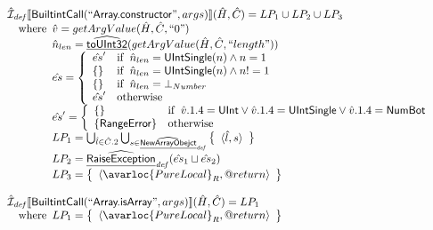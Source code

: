 \[\begin{array}{l}
\aI_{\it def}\lbr \SF{BuiltintCall}(``\SF{Array.constructor}",args)\rbr(\hat{H},\hat{C}) = LP_1 \cup LP_2 \cup LP_3\\
\quad\wherec{
  \hat{v} = getArgValue(\hat{H},\hat{C}, ``0")\\
  \hat{n}_{len} = \ahf{toUInt32}(getArgValue(\hat{H},\hat{C}, ``length"))\\
  \hat{es} = \left\{\begin{array}{ll}
      \hat{es}' & \ifc{\hat{n}_{len} = \SF{UIntSingle}(n) \land n = 1}\\
      \set{} & \ifc{\hat{n}_{len} = \SF{UIntSingle}(n) \land n != 1}\\
      \set{} & \ifc{\hat{n}_{len} = \bot_{Number}}\\
      \hat{es}' & \owc
    \end{array}\right.\\  
  \hat{es}' = \left\{\begin{array}{ll}
      \set{}
      & \ifc{\hat{v}.1.4 = \SF{UInt} \lor \hat{v}.1.4 = \SF{UIntSingle} \lor \hat{v}.1.4 = \SF{NumBot} }\\
      \{ \SF{RangeError} \} & \owc
    \end{array}\right.\\
  LP_1 = \bigcup_{\hat{l} \in \hat{C}.2}\bigcup_{s \in \ahf{NewArrayObejct}_{\it def}}
    \set{\langle \hat{l}, s\rangle}\\
  LP_2 = \ahf{RaiseException}_{\it def}(\hat{es}_1 \sqcup \hat{es}_2)\\
  LP_3 = \set{\langle\avarloc{PureLocal}_R,\varprop{return}\rangle}\\
  }\\
\\



\aI_{\it def}\lbr \SF{BuiltintCall}(``\SF{Array.isArray}",args)\rbr(\hat{H},\hat{C}) = LP_1\\
\quad\wherec{
  LP_1 = \set{\langle\avarloc{PureLocal}_R,\varprop{return}\rangle}\\
  }\\
\\


\end{array}\]
